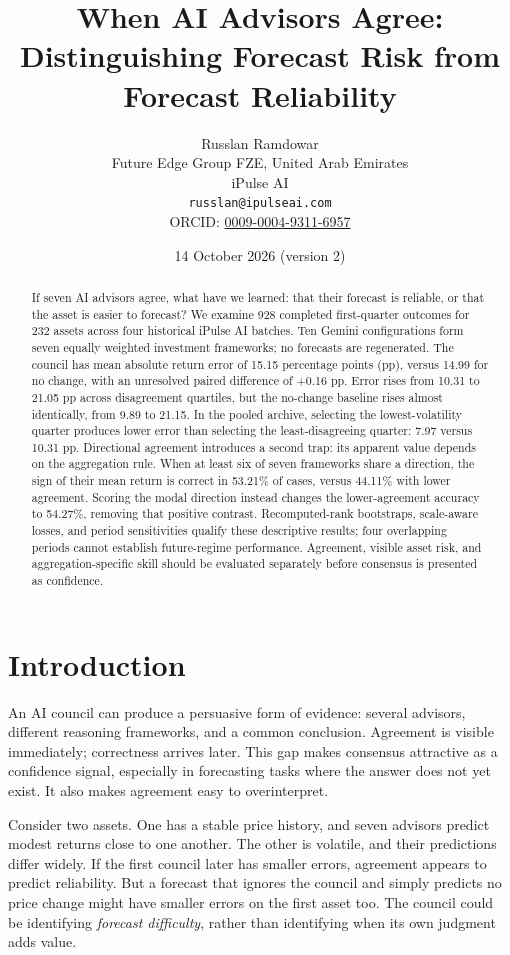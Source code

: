 \documentclass[11pt]{article}
\title{When AI Advisors Agree:\\Distinguishing Forecast Risk from Forecast Reliability}
\author{Russlan Ramdowar\\\small Future Edge Group FZE, United Arab Emirates\\\small iPulse AI\\\small\texttt{russlan@ipulseai.com}\\\small ORCID: \href{https://orcid.org/0009-0004-9311-6957}{0009-0004-9311-6957}}
\date{14 October 2026 (version 2)}
\begin{document}
\maketitle
\begin{abstract}
If seven AI advisors agree, what have we learned: that their forecast is reliable, or that the asset is easier to forecast? We examine 928 completed first-quarter outcomes for 232 assets across four historical iPulse AI batches. Ten Gemini configurations form seven equally weighted investment frameworks; no forecasts are regenerated. The council has mean absolute return error of 15.15 percentage points (pp), versus 14.99 for no change, with an unresolved paired difference of +0.16 pp. Error rises from 10.31 to 21.05 pp across disagreement quartiles, but the no-change baseline rises almost identically, from 9.89 to 21.15. In the pooled archive, selecting the lowest-volatility quarter produces lower error than selecting the least-disagreeing quarter: 7.97 versus 10.31 pp. Directional agreement introduces a second trap: its apparent value depends on the aggregation rule. When at least six of seven frameworks share a direction, the sign of their mean return is correct in 53.21\% of cases, versus 44.11\% with lower agreement. Scoring the modal direction instead changes the lower-agreement accuracy to 54.27\%, removing that positive contrast. Recomputed-rank bootstraps, scale-aware losses, and period sensitivities qualify these descriptive results; four overlapping periods cannot establish future-regime performance. Agreement, visible asset risk, and aggregation-specific skill should be evaluated separately before consensus is presented as confidence.
\end{abstract}

\section{Introduction}
An AI council can produce a persuasive form of evidence: several advisors, different reasoning frameworks, and a common conclusion. Agreement is visible immediately; correctness arrives later. This gap makes consensus attractive as a confidence signal, especially in forecasting tasks where the answer does not yet exist. It also makes agreement easy to overinterpret.

Consider two assets. One has a stable price history, and seven advisors predict modest returns close to one another. The other is volatile, and their predictions differ widely. If the first council later has smaller errors, agreement appears to predict reliability. But a forecast that ignores the council and simply predicts no price change might have smaller errors on the first asset too. The council could be identifying \emph{forecast difficulty}, rather than identifying when its own judgment adds value.
\end{document}
